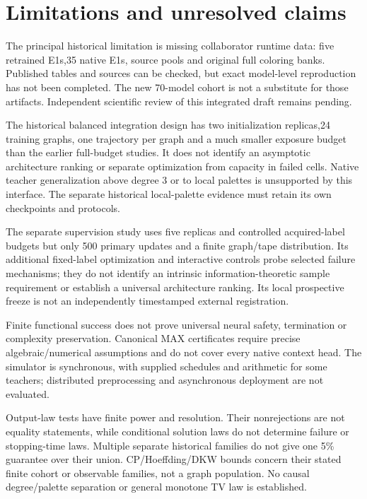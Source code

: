 \documentclass[
  11pt,
]{article}
\begin{document}
\section{Limitations and unresolved
claims}\label{limitations-and-unresolved-claims}

The principal historical limitation is missing collaborator runtime
data: five retrained E1s,35 native E1s, source pools and original full
coloring banks. Published tables and sources can be checked, but exact
model-level reproduction has not been completed. The new 70-model cohort
is not a substitute for those artifacts. Independent scientific review
of this integrated draft remains pending.

The historical balanced integration design has two initialization
replicas,24 training graphs, one trajectory per graph and a much smaller
exposure budget than the earlier full-budget studies. It does not
identify an asymptotic architecture ranking or separate optimization
from capacity in failed cells. Native teacher generalization above
degree 3 or to local palettes is unsupported by this interface. The
separate historical local-palette evidence must retain its own
checkpoints and protocols.

The separate supervision study uses five replicas and controlled
acquired-label budgets but only 500 primary updates and a finite
graph/tape distribution. Its additional fixed-label optimization and
interactive controls probe selected failure mechanisms; they do not
identify an intrinsic information-theoretic sample requirement or
establish a universal architecture ranking. Its local prospective freeze
is not an independently timestamped external registration.

Finite functional success does not prove universal neural safety,
termination or complexity preservation. Canonical MAX certificates
require precise algebraic/numerical assumptions and do not cover every
native context head. The simulator is synchronous, with supplied
schedules and arithmetic for some teachers; distributed preprocessing
and asynchronous deployment are not evaluated.

Output-law tests have finite power and resolution. Their nonrejections
are not equality statements, while conditional solution laws do not
determine failure or stopping-time laws. Multiple separate historical
families do not give one 5\% guarantee over their union.
CP/Hoeffding/DKW bounds concern their stated finite cohort or observable
families, not a graph population. No causal degree/palette separation or
general monotone TV law is established.
\end{document}
